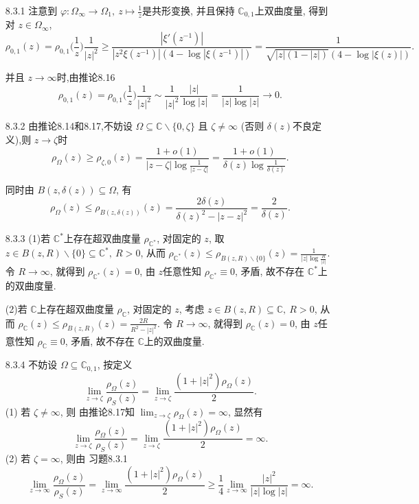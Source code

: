 \begin{itemize}
    
    \item[8.3.1]
     注意到 $\varphi:\Omega_\infty\to \Omega_1,\ z\mapsto \frac{1}{z}$是共形变换, 
     并且保持 $\mathbb{C}_{0,1}$上双曲度量, 得到对 $z \in \Omega_\infty$,
     $$ \rho_{0,1}(z) = \rho_{0,1}\Big(\frac{1}{z}\Big)\frac{1}{|z|^2}
     \ge \frac{|\xi'(z^{-1})|}{|z^2 \xi(z^{-1})|(4-\log|\xi(z^{-1})|)}
     =\frac{1}{\sqrt{|z|(1-|z|)}(4-\log|\xi(z)|)}.$$

     并且 $z\to \infty$时,由推论8.16 $$\rho_{0,1}(z) 
     = \rho_{0,1}\Big(\frac{1}{z}\Big)\frac{1}{|z|^2} 
     \sim  \frac{1}{|z|^2} \frac{|z|}{\log|z|} = \frac{1}{|z|\log|z|}\to 0.$$

    \item[8.3.2]
    由推论8.14和8.17,不妨设 $\Omega\subseteq \mathbb{C}\backslash\{0,\zeta\} $
    且 $\zeta\ne \infty$ (否则 $\delta(z)$不良定义),则 $z\to \zeta$时
    $$\rho_\Omega(z)\ge \rho_{\zeta,0}(z) 
    = \frac{1+o(1)}{|z-\zeta|\log \frac{1}{|z-\zeta|}} 
    = \frac{1+o(1)}{\delta(z)\log \frac{1}{\delta(z)}}.$$

    同时由  $B(z,\delta(z))\subseteq \Omega$, 有  
     $$\rho_{\Omega}(z)\le \rho_{B(z,\delta(z))}(z) 
     = \frac{2\delta(z)}{\delta(z)^2 - |z-z|^2} = \frac{2}{\delta(z)}.$$
    \item[8.3.3]
    (1)若 $\mathbb{C}^*$上存在超双曲度量 $\rho_{\mathbb{C}^*}$,
    对固定的  $z$, 取 $z \in B(z,R)\backslash\{0\}\subseteq \mathbb{C}^*, \ R>0$, 
    从而
    $\rho_{\mathbb{C}^*}(z)\le \rho_{B(z,R)\backslash\{0\}}(z) 
    =\frac{1}{|z|\log \frac{R}{|z|}}. $
    令 $R\to \infty$, 就得到 $\rho_{\mathbb{C}^*}(z) =0$, 
    由 $z$任意性知  $\rho_{\mathbb{C}^*}\equiv 0$, 矛盾, 
    故不存在 $\mathbb{C}^*$上的双曲度量.

    (2)若 $\mathbb{C}$上存在超双曲度量 $\rho_{\mathbb{C}}$,
    对固定的  $z$, 考虑 $z \in B(z,R)\subseteq \mathbb{C}, \ R>0$, 从而
    $\rho_{\mathbb{C}}(z)\le \rho_{B(z,R)}(z) =\frac{2R}{R^2-|z|^2}$.
    令 $R\to \infty$, 就得到 $\rho_{\mathbb{C}}(z) =0$, 
    由 $z$任意性知  $\rho_{\mathbb{C}}\equiv 0$, 矛盾, 
    故不存在 $\mathbb{C}$上的双曲度量.

    \item[8.3.4]
     不妨设 $\Omega \subseteq \mathbb{C}_{0,1}$, 
     按定义 $$\lim_{z \to \zeta}\frac{\rho_{\Omega}(z)}{\rho_{S}(z)} 
     = \lim_{z \to \zeta} \frac{(1+|z|^2)\rho_\Omega(z)}{2}.$$
    (1) 若 $\zeta \ne \infty$, 则 由推论8.17知 
    $\lim_{z \to \zeta}\rho_{\Omega}(z) = \infty$, 显然有
    $$\lim_{z \to \zeta}\frac{\rho_{\Omega}(z)}{\rho_{S}(z)} 
    = \lim_{z \to \zeta} \frac{(1+|z|^2)\rho_\Omega(z)}{2} = \infty.$$
    (2) 若 $\zeta =\infty$, 则由 习题8.3.1 
    $$\lim_{z \to \infty}\frac{\rho_{\Omega}(z)}{\rho_{S}(z)} 
    = \lim_{z \to \infty} \frac{(1+|z|^2)\rho_\Omega(z)}{2}
    \ge \frac{1}{4} \lim_{z \to \infty}\frac{|z|^2}{|z|\log|z|}=\infty.$$


\end{itemize}
